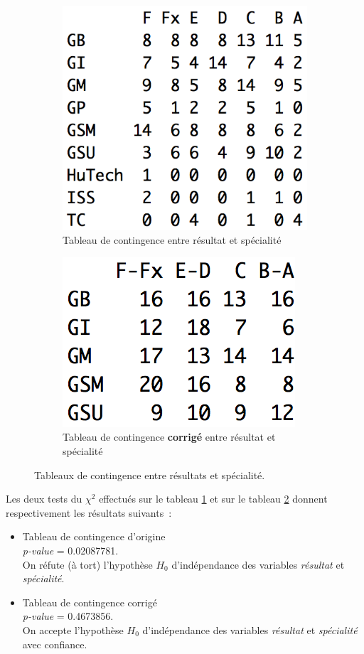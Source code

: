 \documentclass[a4paper,11pt]{report}
\begin{document}
\begin{figure}[H]
	\centering
	\captionsetup{justification=centering, margin=2cm}
	\begin{subfigure}[b]{0.5\linewidth}
		\centering
		\captionsetup{justification=centering, margin=1cm}
		\includegraphics[width=0.5\linewidth]{img/1-1-2-Contingence-Result-Specialite-Origine}
		\caption{\scriptsize Tableau de contingence entre résultat et spécialité}
		\label{fig:tab_contingence_diplome_specialite_origine}
	\end{subfigure}%
	\begin{subfigure}[b]{0.5\linewidth}
		\centering
		\captionsetup{justification=centering, margin=1cm}
		\includegraphics[width=0.5\linewidth]{img/1-1-2-Contingence-Result-Specialite-Corrige}
		\caption{\scriptsize Tableau de contingence \textbf{corrigé} entre résultat et spécialité}
		\label{fig:tab_contingence_diplome_specialite_corrige}
	\end{subfigure}%
	\caption{
		\small Tableaux de contingence entre résultats et spécialité.
	}
	\label{fig:tabs_contingence_resultats_specialite}%
\end{figure}

Les deux tests du $\chi^2$ effectués sur le tableau \ref{fig:tab_contingence_diplome_specialite_origine} et sur le tableau \ref{fig:tab_contingence_diplome_specialite_corrige} donnent respectivement les résultats suivants~:
\begin{itemize}
	\item Tableau de contingence d'origine
	\\ \textit{p-value} = 0.02087781.
	\\On réfute (à tort) l'hypothèse $H_{0}$ d'indépendance des variables \textit{résultat} et \textit{spécialité}.
	
	\item Tableau de contingence corrigé
	\\ \textit{p-value} = 0.4673856.
	\\On accepte l'hypothèse $H_{0}$ d'indépendance des variables \textit{résultat} et \textit{spécialité} avec confiance.
\end{itemize}
\end{document}
